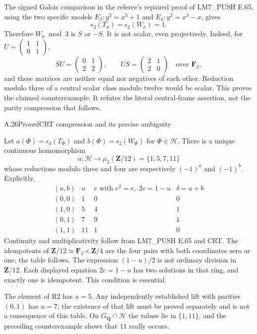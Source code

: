 The signed Galois comparison in the referee's repaired proof of
LM7\_PUSH E.65, using the two specific models
$E_3:y^2=x^3+1$ and $E_4:y^2=x^3-x$, gives
\[
 \epsilon_3(T_\sigma)=\epsilon_2(W_\sigma)=1.
\]
Therefore $W_\sigma\bmod3$ is $S$ or $-S$.  It is not scalar, even
projectively.  Indeed, for $U=\left(\begin{smallmatrix}1&1\\0&1\end{smallmatrix}\right)$,
\[
 SU=\begin{pmatrix}0&1\\2&2\end{pmatrix},\qquad
 US=\begin{pmatrix}2&1\\2&0\end{pmatrix}\quad\text{over }\mathbf F_3,
\]
and these matrices are neither equal nor negatives of each other.
Reduction modulo three of a central scalar class modulo twelve would be
scalar.  This proves the claimed counterexample.  It refutes the literal
central-frame assertion, not the parity compression that follows.

\begin{statement}{A.26}{Proved}{CRT compression and its precise ambiguity}
\end{statement}
Let $a(\Phi)=\epsilon_3(T_\Phi)$ and
$b(\Phi)=\epsilon_2(W_\Phi)$ for $\Phi\in\mathcal H$.
There is a unique continuous homomorphism
\[
 u:\mathcal H\longrightarrow\mu_2(\mathbf Z/12)
 =\{1,5,7,11\}
\]
whose reductions modulo three and four are respectively $(-1)^a$ and
$(-1)^b$.  Explicitly,
\[
\begin{array}{c|c|c|c}
(a,b)&u&e\text{ with }e^2=e,\;2e=1-u&\delta=a+b\\\hline
(0,0)&1&0&0\\
(1,0)&5&4&1\\
(0,1)&7&9&1\\
(1,1)&11&1&0
\end{array}
\]
Continuity and multiplicativity follow from LM7\_PUSH E.65 and CRT.
The idempotents of $\mathbf Z/12\simeq\mathbf F_3\times\mathbf Z/4$
are the four pairs with both coordinates zero or one; the table follows.
The expression $(1-u)/2$ is not ordinary division in $\mathbf Z/12$.
Each displayed equation $2e=1-u$ has two solutions in that ring, and
exactly one is idempotent.  This condition is essential.

The element of R2 has $u=5$.  Any independently established lift with
parities $(0,1)$ has $u=7$; the existence of that lift must be proved
separately and is not a consequence of this table.  On
$G_{\mathbf Q}\cap\mathcal H$ the values lie in $\{1,11\}$, and the
preceding counterexample shows that $11$ really occurs.

